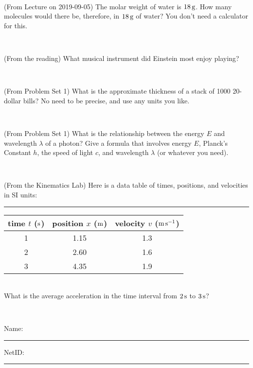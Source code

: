 \documentclass[12pt, letterpaper]{article}
\begin{document}
\vfill ~

\begin{problem} (From Lecture on 2019-09-05)
The molar weight of water is $18\,\mathrm{g}$. How many molecules would there
be, therefore, in $18\,\mathrm{g}$ of water? You don't need a calculator for
this.
\end{problem}


\vfill ~


\clearpage


\begin{problem} (From the reading)
What musical instrument did Einstein most enjoy playing?
\end{problem}


\vfill ~

\begin{problem} (From Problem Set 1)
What is the approximate thickness of a stack of 1000 20-dollar bills?
No need to be precise, and use any units you like.
\end{problem}


\vfill ~

\begin{problem} (From Problem Set 1)
What is the relationship between the energy $E$ and wavelength
$\lambda$ of a photon? Give a formula that involves energy $E$,
Planck's Constant $h$, the speed of light $c$, and wavelength
$\lambda$ (or whatever you need).
\end{problem}

\vfill ~

\begin{problem} (From the Kinematics Lab)
Here is a data table of times, positions, and velocities in SI units:\\
\rule{1.0in}{0pt}\begin{tabular}{c|c|c}
time $t$ ($\mathrm{s}$) & position $x$ ($\mathrm{m}$) & velocity $v$ ($\mathrm{m}\,\mathrm{s}^{-1}$) \\
\hline
1 & 1.15 & 1.3 \\
2 & 2.60 & 1.6 \\
3 & 4.35 & 1.9 \\
\hline
\end{tabular}\\
What is the average acceleration in the time interval from $2\,\mathrm{s}$ to $3\,\mathrm{s}$?
\end{problem}


\vfill ~


\cleardoublepage



\noindent
Name: \rule[-1ex]{0.60\textwidth}{0.1pt}
NetID: \rule[-1ex]{0.20\textwidth}{0.1pt}
\end{document}
